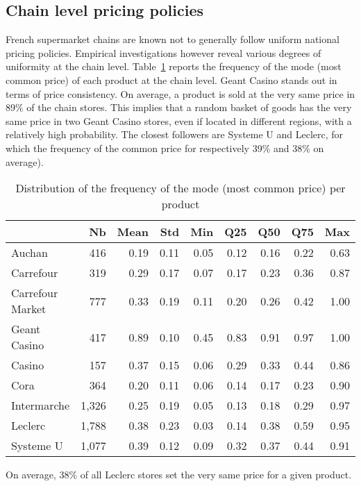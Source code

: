 \documentclass[english]{article}
\begin{document}
\subsection{Chain level pricing policies}

French supermarket chains are known not to generally follow uniform national pricing policies. Empirical investigations however reveal various degrees of uniformity at the chain level. Table~\ref{tab:qlmc_prod_freq} reports the frequency of the mode (most common price) of each product at the chain level. Geant Casino stands out in terms of price consistency. On average, a product is sold at the very same price in 89\% of the chain stores. This implies that a random basket of goods has the very same price in two Geant Casino stores, even if located in different regions, with a relatively high probability. The closest followers are Systeme U and Leclerc, for which the frequency of the common price for respectively 39\% and 38\% on average).

\begin{table}[H]
\caption{Distribution of the frequency of the mode (most common price) per product}
\label{tab:qlmc_prod_freq}
\begin{threeparttable}
\renewcommand{\arraystretch}{0.7}%
\small
\begin{tabular}{lrrrrrrrr}
\toprule
\toprule
{}                 &  Nb &  Mean &  Std &  Min &  Q25 &  Q50 &  Q75 &  Max \\
\midrule
Auchan             &   416 &  0.19 & 0.11 & 0.05 & 0.12 & 0.16 & 0.22 & 0.63 \\
Carrefour          &   319 &  0.29 & 0.17 & 0.07 & 0.17 & 0.23 & 0.36 & 0.87 \\
Carrefour Market   &   777 &  0.33 & 0.19 & 0.11 & 0.20 & 0.26 & 0.42 & 1.00 \\
Geant Casino       &   417 &  0.89 & 0.10 & 0.45 & 0.83 & 0.91 & 0.97 & 1.00 \\
Casino             &   157 &  0.37 & 0.15 & 0.06 & 0.29 & 0.33 & 0.44 & 0.86 \\
Cora               &   364 &  0.20 & 0.11 & 0.06 & 0.14 & 0.17 & 0.23 & 0.90 \\
Intermarche        & 1,326 &  0.25 & 0.19 & 0.05 & 0.13 & 0.18 & 0.29 & 0.97 \\
Leclerc            & 1,788 &  0.38 & 0.23 & 0.03 & 0.14 & 0.38 & 0.59 & 0.95 \\
Systeme U          & 1,077 &  0.39 & 0.12 & 0.09 & 0.32 & 0.37 & 0.44 & 0.91 \\
\bottomrule
\bottomrule
\end{tabular}
\begin{tablenotes}
      \small
      \item On average, 38\% of all Leclerc stores set the very same price for a given product.
\end{tablenotes}
\end{threeparttable}
\end{table}
\end{document}
